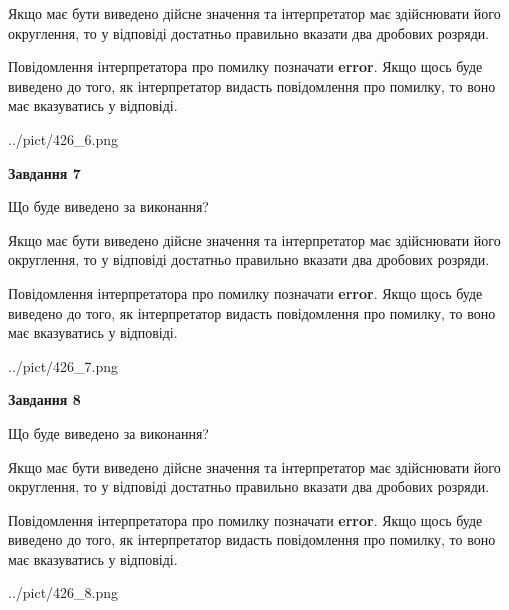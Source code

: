 \documentclass[12pt, ukrainian]{article}
\begin{document}
{\begin {Large}
Якщо має бути виведено дійсне значення та інтерпретатор має здійснювати його округлення, 
то у відповіді достатньо правильно вказати два дробових розряди.

Повідомлення інтерпретатора про помилку позначати \textbf{error}.
Якщо щось буде виведено до того, як інтерпретатор видасть повідомлення про помилку, 
то воно має вказуватись у відповіді. \par

\begin{center}
	{../pict/426_6.png}
\end{center}
\newpage

{\begin {center}\textbf{Завдання 7}\end {center}}\par
Що буде виведено за виконання? \par

Якщо має бути виведено дійсне значення та інтерпретатор має здійснювати його округлення, 
то у відповіді достатньо правильно вказати два дробових розряди.

Повідомлення інтерпретатора про помилку позначати \textbf{error}.
Якщо щось буде виведено до того, як інтерпретатор видасть повідомлення про помилку, 
то воно має вказуватись у відповіді. \par

\begin{center}
	{../pict/426_7.png}
\end{center}
\newpage

{\begin {center}\textbf{Завдання 8}\end {center}}\par
Що буде виведено за виконання? \par

Якщо має бути виведено дійсне значення та інтерпретатор має здійснювати його округлення, 
то у відповіді достатньо правильно вказати два дробових розряди.

Повідомлення інтерпретатора про помилку позначати \textbf{error}.
Якщо щось буде виведено до того, як інтерпретатор видасть повідомлення про помилку, 
то воно має вказуватись у відповіді. \par

\begin{center}
	{../pict/426_8.png}
\end{center}
\newpage


\end{Large}}
\end{document}
